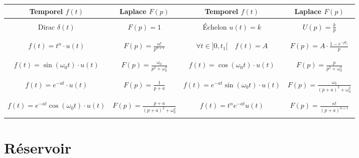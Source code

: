 \begin{center}
\begin{tabular}{|c|c||c|c|}
\hline
Temporel $f(t)$ & Laplace $F(p)$ & 
Temporel $f(t)$ & Laplace $F(p)$ \\
\hline
\hline
 &&& \\
Dirac $\delta(t)$ &
$F(p)=1$ &
Échelon $ u(t)=k $&
$ U(p) = \frac{k}{p}$
\\
&&& \\
\hline
&&& \\
$f(t) = t^n\cdot u(t)$ &
$F(p)=\frac{n!}{p^{n+1}} $ &
$\forall t\in ]0,t_1 [ \quad f(t)= A$ & 
$F(p) =A \cdot \frac{1-e^{-pt_1}}{p} $\\
&&& \\
\hline
&&& \\
$f(t) = \sin \left( \omega_0 t\right) \cdot u(t)$ &
$F(p) = \frac{\omega_0}{p^2+\omega_0^2} $ &
$f(t) = \cos \left( \omega_0 t\right) \cdot u(t)$ & 
$F(p) = \frac{p}{p^2+\omega_0^2} $ \\
&&& \\
\hline
&&& \\
$f(t)= e^{-at}\cdot u(t)$ & 
$F(p)= \frac{1}{p+a}$ &
$f(t) = e^{-at}\sin\left( \omega_0 t\right) \cdot u(t)$ &
$F(p)=\frac{\omega_0}{\left( p+a\right)^2 + \omega_0^2}$  \\
&&& \\
\hline
&&& \\
$f(t) = e^{-at}\cos\left( \omega_0 t\right) \cdot u(t)$ &
$F(p)=\frac{p+a}{\left( p+a\right)^2 + \omega_0^2}$  &
$f(t)=t^ne^{-at}u(t)$ & $F(p)=\frac{n!}{\left( p+a\right)^{n+1}}$ \\
&&& \\
\hline
\end{tabular}
\end{center}

\newpage

\section{Réservoir}

